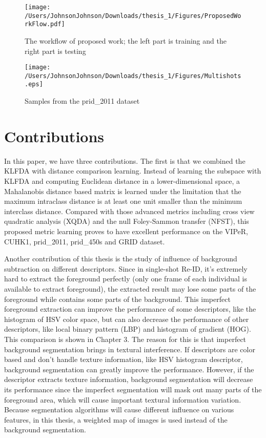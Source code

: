 \begin{figure}[H]

\texttt{[image: /Users/JohnsonJohnson/Downloads/thesis\_1/Figures/ProposedWorkFlow.pdf]}
\vspace{-2em}
\caption{The workflow of proposed work; the left part is training and the right part is testing}
\label{ProposedWorkflow}

\end{figure}
\begin{figure}[H]

\texttt{[image: /Users/JohnsonJohnson/Downloads/thesis\_1/Figures/Multishots.eps]}
\vspace{-2em}
\caption{Samples from the prid\_2011 dataset}

\end{figure}


\section{Contributions}

In this paper, we have three contributions. The first is that we combined the KLFDA with distance comparison learning. Instead of learning the subspace with KLFDA and computing Euclidean distance in a lower-dimensional space, a Mahalanobis distance based matrix is learned under the limitation that the maximum intraclass distance is at least one unit smaller than the minimum interclass distance. Compared with those advanced metrics including cross view quadratic analysis (XQDA) \cite{LOMO} and the null Foley-Sammon transfer (NFST), this proposed metric learning proves to have excellent performance on the VIPeR, CUHK1, prid\_2011, prid\_450s and GRID dataset.

Another contribution of this thesis is the study of influence of background subtraction on different descriptors. Since in single-shot Re-ID, it's extremely hard to extract the foreground perfectly (only one frame of each individual is available to extract foreground), the extracted result may lose some parts of the foreground while contains some parts of the background. This imperfect foreground extraction can improve the performance of some descriptors, like the histogram of HSV color space, but can also decrease the performance of  other descriptors, like local binary pattern (LBP) and histogram of gradient (HOG). This comparison is shown in Chapter 3. The reason for this is that imperfect background segmentation brings in textural interference. If descriptors are color based and don't handle texture information, like HSV histogram descriptor, background segmentation can greatly improve the performance. However, if the descriptor extracts texture information, background segmentation will decrease its performance since the imperfect segmentation will mask out many parts of the foreground area, which will cause important textural information variation. Because segmentation algorithms will cause different influence on various features, in this thesis, a weighted map of images is used instead of the background segmentation.

